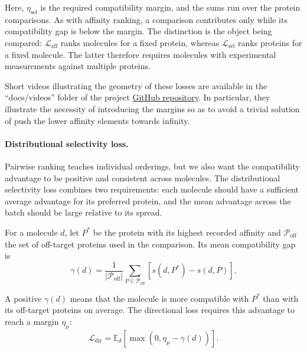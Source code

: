 \documentclass[a4paper,12pt]{article}
\begin{document}
Here, $\eta_{\mathrm{sel}}$ is the required compatibility margin, and the sums run over the protein comparisons. As with affinity ranking, a comparison contributes only while its compatibility gap is below the margin. The distinction is the object being compared: $\mathcal{L}_{\mathrm{aff}}$ ranks molecules for a fixed protein, whereas $\mathcal{L}_{\mathrm{sel}}$ ranks proteins for a fixed molecule. The latter therefore requires molecules with experimental measurements against multiple proteins.

Short videos illustrating the geometry of these losses are available in the ``docs/videos'' folder of the project \href{https://github.com/DutraIRS/SelVAEGen}{GitHub repository}. In particular, they illustrate the necessity of introducing the margins so as to avoid a trivial solution of push the lower affinity elements towards infinity.

\paragraph{Distributional selectivity loss.}
Pairwise ranking teaches individual orderings, but we also want the compatibility advantage to be positive and consistent across molecules. The distributional selectivity loss combines two requirements: each molecule should have a sufficient average advantage for its preferred protein, and the mean advantage across the batch should be large relative to its spread.

For a molecule $d$, let $P^{*}$ be the protein with its highest recorded affinity and $\mathcal{P}_{\mathrm{off}}$ the set of off-target proteins used in the comparison. Its mean compatibility gap is
\begin{equation*}
    \gamma(d)
    =
    \frac{1}{|\mathcal{P}_{\mathrm{off}}|}
    \sum_{P\in\mathcal{P}_{\mathrm{off}}}
    \left[
        s(d,P^{*})
        -
        s(d,P)
        \right].
\end{equation*}

A positive $\gamma(d)$ means that the molecule is more compatible with $P^{*}$ than with its off-target proteins on average. The directional loss requires this advantage to reach a margin $\eta_{\mu}$:
\begin{equation*}
    \mathcal{L}_{\mathrm{dir}}
    =
    \mathbb{E}_{d}
    \left[
        \max
        \left(
        0,
        \eta_{\mu}
        -
        \gamma(d)
        \right)
        \right].
\end{equation*}
\end{document}
